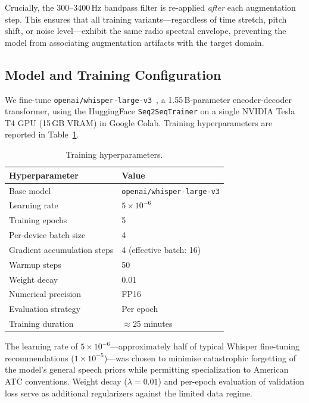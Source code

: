 \documentclass[11pt,a4paper]{article}
\begin{document}
Crucially, the 300--3400\,Hz bandpass filter is re-applied \emph{after} each
augmentation step. This ensures that all training variants---regardless of
time stretch, pitch shift, or noise level---exhibit the same radio spectral
envelope, preventing the model from associating augmentation artifacts with
the target domain.

\subsection{Model and Training Configuration}
\label{sec:training}

We fine-tune \texttt{openai/whisper-large-v3}~\cite{radford2023whisper}, a
1.55\,B-parameter encoder-decoder transformer, using the HuggingFace
\texttt{Seq2SeqTrainer} on a single NVIDIA Tesla T4 GPU (15\,GB VRAM) in
Google Colab. Training hyperparameters are reported in
Table~\ref{tab:hyperparams}.

\begin{table}[h]
\centering
\caption{Training hyperparameters.}
\label{tab:hyperparams}
\begin{tabular}{ll}
\toprule
\textbf{Hyperparameter} & \textbf{Value} \\
\midrule
Base model                  & \texttt{openai/whisper-large-v3} \\
Learning rate               & $5 \times 10^{-6}$ \\
Training epochs             & 5 \\
Per-device batch size       & 4 \\
Gradient accumulation steps & 4 (effective batch: 16) \\
Warmup steps                & 50 \\
Weight decay                & 0.01 \\
Numerical precision         & FP16 \\
Evaluation strategy         & Per epoch \\
Training duration           & $\approx$25 minutes \\
\bottomrule
\end{tabular}
\end{table}

The learning rate of $5 \times 10^{-6}$---approximately half of typical Whisper
fine-tuning recommendations ($1 \times 10^{-5}$)---was chosen to minimise
catastrophic forgetting of the model's general speech priors while permitting
specialization to American ATC conventions. Weight decay ($\lambda = 0.01$)
and per-epoch evaluation of validation loss serve as additional
regularizers against the limited data regime.
\end{document}
